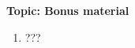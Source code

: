 
\flushleft\textbf{Topic: Bonus material}

\begin{enumerate}[label=16.\arabic*]
	\item ???

\end{enumerate}

